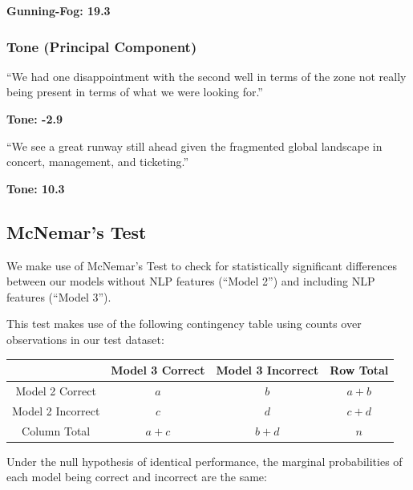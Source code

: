 \documentclass{article}[11pt]
\begin{document}
    \textbf{Gunning-Fog: 19.3}

    \subsubsection{Tone (Principal Component)}

    \begin{em}
        ``We had one disappointment with the second well in terms of the zone not really being present in terms of what we were looking for.''
    \end{em}

    \textbf{Tone: -2.9}

    \begin{em}
        ``We see a great runway still ahead given the fragmented global landscape in concert, management, and ticketing.''
    \end{em}

    \textbf{Tone: 10.3}

    \clearpage
    \newpage
    \subsection{McNemar's Test}

    \label{sec:mcnemars-test}

    We make use of McNemar's Test to check for statistically significant differences between our models without NLP features (``Model 2'') and including NLP features (``Model 3'').

    This test makes use of the following contingency table using counts over observations in our test dataset:

    \begin{center}
        \begin{tabular}{|c|c|c|c|}
            \hline 
                & Model 3 Correct & Model 3 Incorrect & Row Total\tabularnewline
            \hline 
            \hline 
            Model 2 Correct & $a$ & $b$ & $a+b$\tabularnewline
            \hline 
            Model 2 Incorrect & $c$ & $d$ & $c+d$\tabularnewline
            \hline 
            Column Total & $a+c$ & $b+d$ & $n$\tabularnewline
            \hline 
        \end{tabular}
    \par\end{center}

    Under the null hypothesis of identical performance, the marginal probabilities of each model being correct and incorrect are the same: 
\end{document}

